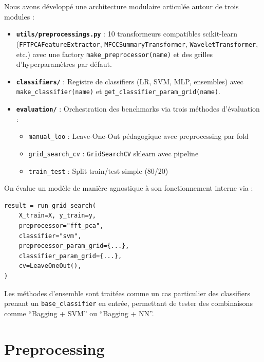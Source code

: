 \documentclass{name}
\begin{document}
Nous avons développé une architecture modulaire articulée autour de trois modules :

\begin{itemize}
    \item \textbf{\texttt{utils/preprocessings.py}} : 10 transformeurs compatibles scikit-learn (\texttt{FFTPCAFeatureExtractor}, \texttt{MFCCSummaryTransformer}, \texttt{WaveletTransformer}, etc.) avec une factory \texttt{make\_preprocessor(name)} et des grilles d'hyperparamètres par défaut.
    \item \textbf{\texttt{classifiers/}} : Registre de classifiers (LR, SVM, MLP, ensembles) avec \texttt{make\_classifier(name)} et \texttt{get\_classifier\_param\_grid(name)}.
    \item \textbf{\texttt{evaluation/}} : Orchestration des benchmarks via trois méthodes d'évaluation :
    \begin{itemize}
        \item \texttt{manual\_loo} : Leave-One-Out pédagogique avec preprocessing par fold
        \item \texttt{grid\_search\_cv} : \texttt{GridSearchCV} sklearn avec pipeline
        \item \texttt{train\_test} : Split train/test simple (80/20)
    \end{itemize}
\end{itemize}

On évalue un modèle de manière agnostique à son fonctionnement interne via :

\begin{lstlisting}[caption={API de benchmark unifié}]
result = run_grid_search(
    X_train=X, y_train=y,
    preprocessor="fft_pca",
    classifier="svm",
    preprocessor_param_grid={...},
    classifier_param_grid={...},
    cv=LeaveOneOut(),
)
\end{lstlisting}

Les méthodes d'ensemble sont traitées comme un cas particulier des classifiers prenant un \texttt{base\_classifier} en entrée, permettant de tester des combinaisons comme ``Bagging + SVM'' ou ``Bagging + NN''.

\newpage
\section{Preprocessing}
\end{document}

